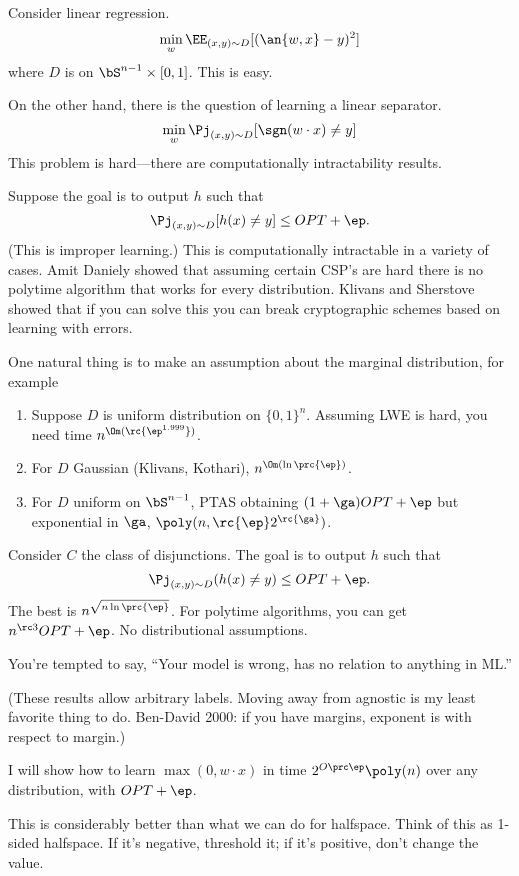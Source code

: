 Consider linear regression.
$$
\min_w \EE_{(x,y)\sim D} [(\an{w,x}-y)^2]
$$
where $D$ is on $\bS^{n-1}\times [0,1]$. This is easy. 

On the other hand, there is the question of learning a linear separator. 
$$
\min_w \Pj_{(x,y)\sim D} [\sgn(w\cdot x)\ne y]
$$
This problem is hard---there are computationally intractability results. 

Suppose the goal is to output $h$ such that 
$$
\Pj_{(x,y)\sim D} [h(x)\ne y] \le OPT+\ep.
$$
(This is improper learning.) This is computationally intractable in a variety of cases. Amit Daniely showed that assuming certain CSP's are hard there is no polytime algorithm that works for every distribution. Klivans and Sherstove showed that if you can solve this you can break cryptographic schemes based on learning with errors.

One natural thing is to make an assumption about the marginal distribution, for example
\begin{enumerate}
\item
Suppose $D$ is uniform distribution on $\{0,1\}^n$. Assuming LWE is hard, you need time $n^{\Om(\rc{\ep^{1.999}})}$. 
\item
For $D$ Gaussian (Klivans, Kothari), $n^{\Om(\ln \prc{\ep})}$. 
\item
For $D$ uniform on $\bS^{n-1}$, PTAS obtaining $(1+\ga)OPT+\ep$ but exponential in $\ga$, $\poly(n, \rc{\ep}2^{\rc{\ga}})$.
\end{enumerate}

Consider $C$ the class of disjunctions. The goal is to output $h$ such that 
$$
\Pj_{(x,y)\sim D}(h(x)\ne y) \le OPT+\ep.
$$
The best %
is $n^{\sqrt{n\ln \prc{\ep}}}$. For polytime algorithms, you can get $n^{\rc 3}OPT+\ep$. No distributional assumptions.

You're tempted to say, ``Your model is wrong, has no relation to anything in ML.''

(These results allow arbitrary labels. Moving away from agnostic is my least favorite thing to do. Ben-David 2000: if you have margins, exponent is with respect to margin.)

I will show how to learn $\max(0,w\cdot x)$ in time $2^{O\prc\ep}\poly(n)$ over any distribution, with $OPT+\ep$. 

This is considerably better than what we can do for halfspace.
Think of this as 1-sided halfspace.
If it's negative, threshold it; if it's positive, don't change the value.

